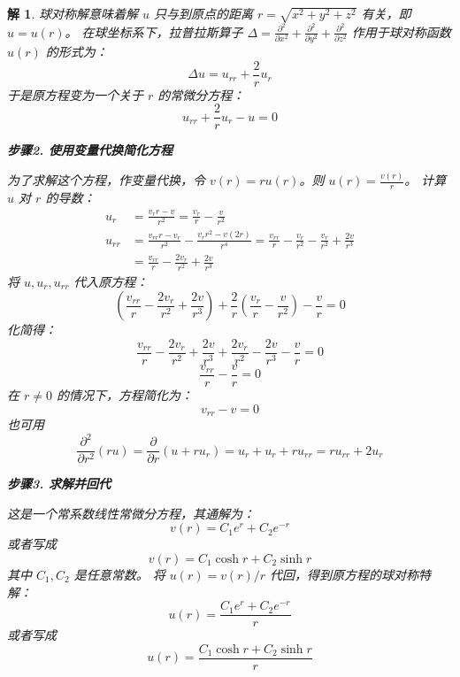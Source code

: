 \documentclass[12pt,a4paper]{article}
\newtheorem*{solution}{解}
\begin{document}
\begin{solution}
		
		
		球对称解意味着解 $u$ 只与到原点的距离 $r = \sqrt{x^2+y^2+z^2}$ 有关，即 $u=u(r)$。
		在球坐标系下，拉普拉斯算子 $\Delta = \frac{\partial^2}{\partial x^2} + \frac{\partial^2}{\partial y^2} + \frac{\partial^2}{\partial z^2}$ 作用于球对称函数 $u(r)$ 的形式为：
		\[
		\Delta u = u_{rr} + \frac{2}{r} u_r
		\]
		于是原方程变为一个关于 $r$ 的常微分方程：
		\[
		u_{rr} + \frac{2}{r} u_r - u = 0
		\]
		
		\hrulefill
		
		\textbf{步骤2. 使用变量代换简化方程}
		
		\noindent
		为了求解这个方程，作变量代换，令 $v(r) = r u(r)$。则 $u(r) = \frac{v(r)}{r}$。
		计算 $u$ 对 $r$ 的导数：
		\begin{align*}
			u_r &= \frac{v_r r - v}{r^2} = \frac{v_r}{r} - \frac{v}{r^2} \\[6pt]
			u_{rr} &= \frac{v_{rr} r - v_r}{r^2} - \frac{v_r r^2 - v (2r)}{r^4} = \frac{v_{rr}}{r} - \frac{v_r}{r^2} - \frac{v_r}{r^2} + \frac{2v}{r^3} \\[6pt]
			&= \frac{v_{rr}}{r} - \frac{2v_r}{r^2} + \frac{2v}{r^3}
		\end{align*}
		将 $u, u_r, u_{rr}$ 代入原方程：
		\[
		\left( \frac{v_{rr}}{r} - \frac{2v_r}{r^2} + \frac{2v}{r^3} \right) + \frac{2}{r} \left( \frac{v_r}{r} - \frac{v}{r^2} \right) - \frac{v}{r} = 0
		\]
		化简得：
		\[
		\frac{v_{rr}}{r} - \frac{2v_r}{r^2} + \frac{2v}{r^3} + \frac{2v_r}{r^2} - \frac{2v}{r^3} - \frac{v}{r} = 0
		\]
		\[
		\frac{v_{rr}}{r} - \frac{v}{r} = 0
		\]
		在 $r \neq 0$ 的情况下，方程简化为：
		\[
		v_{rr} - v = 0
		\]
		也可用
		\begin{equation*}
			\frac{\partial^2}{\partial r^2}(ru) = \frac{\partial}{\partial r}(u + ru_r) = u_r + u_r + r u_{rr} = r u_{rr} + 2u_r
		\end{equation*}

		
		
		\hrulefill
		
		\textbf{步骤3. 求解并回代}
		
		\noindent
		这是一个常系数线性常微分方程，其通解为：
		\[
		v(r) = C_1 e^r + C_2 e^{-r}
		\]
		或者写成
			\[
		v(r) = C_1 \cosh r + C_2 \sinh r
			\]
		其中 $C_1, C_2$ 是任意常数。
		将 $u(r) = v(r)/r$ 代回，得到原方程的球对称特解：
		\[
		u(r) = \frac{C_1 e^r + C_2 e^{-r}}{r}
		\]
		或者写成
		\[
			u(r) = \frac{C_1 \cosh r + C_2 \sinh r}{r}
		\]
	\end{solution}
	
\end{document}
